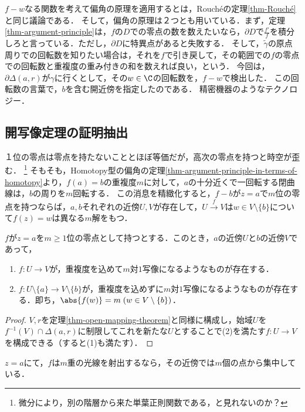 \documentclass[uplatex, dvipdfmx]{jsreport}
\begin{document}
\begin{remarks}[偏角の原理の重要な応用]
    $f-w$なる関数を考えて偏角の原理を適用するとは，Rouchéの定理\ref{thm-Rouché}と同じ議論である．
    そして，偏角の原理は２つとも用いている．まず，定理\ref{thm-argument-principle}は，$f$の$D$での零点の数を数えたいなら，$\partial D$で$\frac{f'}{f}$を積分しろと言っている．ただし，$\partial D$に特異点があると失敗する．
    そして，$\tilde{\gamma}$の原点周りでの回転数を知りたい場合は，それを$f$で引き戻して，その範囲での$f$の零点での回転数と重複度の重み付きの和を数えれば良い，という．
    今回は，$\partial\Delta(a,r)$が$\gamma$に行くとして，その$w\in\C$の回転数を，$f-w$で検出した．
    この回転数の言葉で，$b$を含む開近傍を指定したのである．
    精密機器のようなテクノロジー．
\end{remarks}

\subsection{開写像定理の証明抽出}

\begin{tcolorbox}[colframe=ForestGreen, colback=ForestGreen!10!white,breakable,colbacktitle=ForestGreen!40!white,coltitle=black,fonttitle=\bfseries\sffamily,
title=]
    １位の零点は零点を持たないこととほぼ等価だが，高次の零点を持つと時空が歪む．
    \footnote{微分により，別の階層から来た単葉正則関数である，と見れないのか？}
    そもそも，Homotopy型の偏角の定理\ref{thm-argument-principle-in-terms-of-homotopy}より，$f(a)=b$の重複度$m$に対して，$a$の十分近くで一回転する閉曲線は，$b$の周りを$m$回転する．
    この消息を精緻化すると，$f-b$が$z=a$で$m$位の零点を持つならば，$a,b$それぞれの近傍$U,V$が存在して，$U\xrightarrow{f}V$は$w\in V\setminus\{b\}$について$f(z)=w$は異なる$m$解をもつ．
\end{tcolorbox}

\begin{corollary}[開写像定理の証明抽出]\label{cor-uninjectivity-around-zeros}
    $f$が$z=a$を$m\ge 1$位の零点として持つとする．このとき，$a$の近傍$U$と$b$の近傍$V$であって，
    \begin{enumerate}
        \item $f:U\to V$が，重複度を込めて$m$対$1$写像になるようなものが存在する．
        \item $f:U\setminus\{a\}\to V\setminus\{b\}$が，重複度を込めずに$m$対$1$写像になるようなものが存在する．即ち，$\abs{f(w)}=m\;(w\in V\setminus\{b\})$．
    \end{enumerate}
\end{corollary}
\begin{proof}
    $V,r$を定理\ref{thm-open-mapping-theorem}と同様に構成し，始域$U$を$f^{-1}(V)\cap\Delta(a,r)$に制限してこれを新たな$U$とすることで(2)を満たす$f:U\to V$を構成できる（すると(1)も満たす）．
\end{proof}
\begin{image}
    $z=a$にて，$f$は$m$重の光線を射出するなら，その近傍では$m$個の点から集中している．
\end{image}
\end{document}
